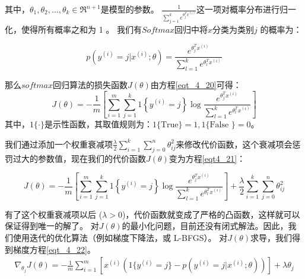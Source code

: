 其中，$\theta_1, \theta_2, \ldots, \theta_k \in \Re^{n+1}$是模型的参数。
$\frac{1}{ \sum_{j=1}^{k}{e^{ \theta_j^T x^{(i)} }} }$这一项对概率分布进行归一化，使得所有概率之和为 1 。
我们有$Softmax$回归中将$x$分类为类别$j$ 的概率为：\par
\begin{equation}
p(y^{(i)} = j | x^{(i)} ; \theta) = \frac{e^{\theta_j^T x^{(i)}}}{\sum_{l=1}^k e^{ \theta_l^T x^{(i)}} }
\end{equation}

那么$softmax$回归算法的损失函数$J(\theta)$由方程\eqref{eqt_4_20}可得：
\begin{equation}
	\label{eqt_4_20}
	J(\theta) = - \frac{1}{m} \left[ \sum_{i=1}^{m} \sum_{j=1}^{k}  1\left\{y^{(i)} = j\right\} \log \frac{e^{\theta_j^T x^{(i)}}}{\sum_{l=1}^k e^{ \theta_l^T x^{(i)} }}\right]
\end{equation}
其中，$1\{\cdot\}$是示性函数，其取值规则为：$1\{ \text{True} \}=1, 1\{ \text{False }\}=0$。\par

我们通过添加一个权重衰减项$\frac{\lambda}{2} \sum_{i=1}^k \sum_{j=0}^{n} \theta_{ij}^2$来修改代价函数，这个衰减项会惩罚过大的参数值，现在我们的代价函数$J(\theta)$变为方程\eqref{eqt4_21}：\par
\begin{equation}
	\label{eqt4_21}
	J(\theta) = - \frac{1}{m} \left[ \sum_{i=1}^{m} \sum_{j=1}^{k} 1\left\{y^{(i)} 
	= j\right\} \log \frac{e^{\theta_j^T x^{(i)}}}{\sum_{l=1}^k e^{ \theta_l^T x^{(i)} }}  \right]
	+ \frac{\lambda}{2} \sum_{i=1}^k \sum_{j=0}^n \theta_{ij}^2
\end{equation}

有了这个权重衰减项以后 ($\lambda > 0$)，代价函数就变成了严格的凸函数，这样就可以保证得到唯一的解了。
对$J(\theta)$的最小化问题，目前还没有闭式解法。因此，我们使用迭代的优化算法（例如梯度下降法，或 L-BFGS）。
对$J(\theta)$求导，我们得到梯度方程\eqref{eqt_4_22}。
\begin{align}
	\label{eqt_4_22}
	\nabla_{\theta_j} J(\theta) = - \frac{1}{m} \sum_{i=1}^{m}{ \left[ x^{(i)} ( 1\{ y^{(i)} = j\}  - p(y^{(i)} = j | x^{(i)}; \theta) ) \right]  } + \lambda \theta_j
\end{align}

